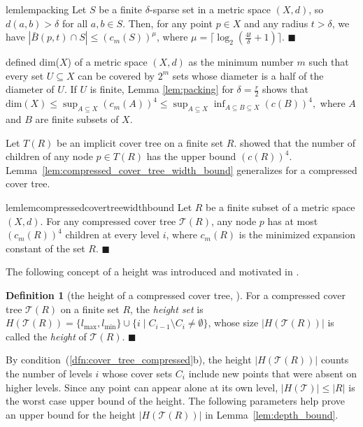 \documentclass[a4paper,UKenglish,cleveref, autoref]{lipics-v2019}
\numberwithin{algocf}{section}
\theoremstyle{definition}
\newtheorem{dfn}[algocf]{Definition}
\theoremstyle{definition}
\theoremstyle{definition}
\theoremstyle{plain}
\newcommand{\T}{\mathcal{T}}
\newcommand{\bs}{\hfill $\blacksquare$}
\begin{document}
\begin{restatable}{lem}{lempacking}
\label{lem:packing}
Let $S$ be a finite $\delta$-sparse set in a metric space $(X,d)$, so $d(a,b) > \delta$ for all $a,b \in S$. 
Then, for any point $ p \in X$ and any radius $t > \delta$, we have
$|\bar{B}(p, t)  \cap S | \leq (c_m(S))^{\mu}$, where $\mu = \lceil \log_2(\frac{4t}{\delta} + 1) \rceil $.
\bs
\end{restatable}

\cite[Section~1.1]{krauthgamer2004navigating} defined dim($X$) of a metric space $(X,d)$ as the minimum number $m$ such that every set $U \subseteq X$ can be covered by $2^{m}$ sets whose diameter is a half of the diameter of $U$. 
If $U$ is finite, Lemma \ref{lem:packing} for $\delta = \frac{r}{2}$ shows that
$\text{dim}(X) \leq \sup_{A \subseteq X}(c_m(A))^4 \leq \sup_{A \subseteq X}\inf_{A \subseteq B \subseteq X}(c(B))^4,$
where $A$ and $B$ are finite subsets of $X$. 
\medskip

Let $T(R)$ be an implicit cover tree \cite{beygelzimer2006cover} on a finite set $R$. 
\cite[Lemma~4.1]{beygelzimer2006cover} showed that the number of children of any node $p \in T(R)$ has the upper bound $(c(R))^4$. 
Lemma~\ref{lem:compressed_cover_tree_width_bound} generalizes \cite[Lemma~4.1]{beygelzimer2006cover} for a compressed cover tree.

\begin{restatable} {lem}{lemcompressedcovertreewidthbound}
\label{lem:compressed_cover_tree_width_bound}
Let $R$ be a finite subset of a metric space $(X,d)$. 
For any compressed cover tree $\T(R)$, any node $p$ has at most $(c_m(R))^4$ children at every level $i$, where $c_m(R)$ is the minimized expansion constant of the set $R$.
\bs
\end{restatable}

The following concept of a height was introduced and motivated in \cite[Definition~2.11]{elkin2021new}.

\begin{dfn}[the height of a compressed cover tree, {\cite[Definition~2.11]{elkin2021new}}]
\label{dfn:depth}
For a compressed cover tree $\T(R)$ on a finite set $R$,
the \emph{height set} is $H(\T(R))=\{l_{\max},l_{\min}\}\cup \{ i \mid C_{i-1} \setminus C_{i} \neq \emptyset\}$, whose size $|H(\T(R))|$ is called the \emph{height} of $\T(R)$.
\bs
\end{dfn}

By condition~(\ref{dfn:cover_tree_compressed}b), the height $|H(\T(R))|$ counts the number of levels $i$ whose cover sets $C_i$ include new points that were absent on higher levels.
Since any point can appear alone at its own level, $|H(\T)|\leq|R|$ is the worst case upper bound of the height.
The following parameters help prove an upper bound for the height $|H(\T(R))|$ in Lemma~\ref{lem:depth_bound}. 
\end{document}
